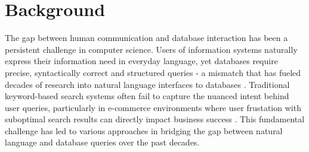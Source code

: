 \documentclass[../../submission.tex]{subfiles}
\begin{document}
\section{Background}
The gap between human communication and database interaction has been a persistent challenge in computer science. 
Users of information systems naturally express their information need in everyday language, yet databases require
precise, syntactically correct and structured queries - a mismatch that has fueled decades of research into natural language
interfaces to databases \cite{androutsopoulosNaturalLanguageInterfaces1995}.
Traditional keyword-based search systems often fail to capture the nuanced intent behind user queries,
particularly in e-commerce environments where user frustation with suboptimal search results can directly
impact business success \cite{manchandaIntentTermSelection2019}. This fundamental challenge has led to 
various approaches in bridging the gap between natural language and database queries over the past decades.
\end{document}
